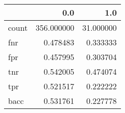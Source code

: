 \begin{tabular}{lrr}
\toprule
{} &         0.0 &        1.0 \\
\midrule
count &  356.000000 &  31.000000 \\
fnr   &    0.478483 &   0.333333 \\
fpr   &    0.457995 &   0.303704 \\
tnr   &    0.542005 &   0.474074 \\
tpr   &    0.521517 &   0.222222 \\
bacc  &    0.531761 &   0.227778 \\
\bottomrule
\end{tabular}
